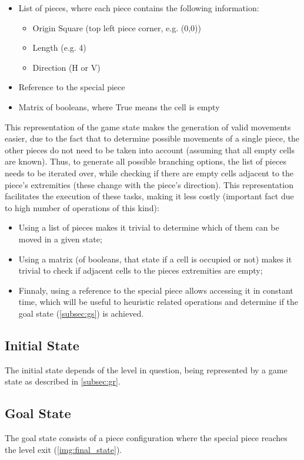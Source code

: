 \documentclass[conference]{IEEEtran}
\begin{document}
\begin{itemize}
    \item List of pieces, where each piece contains the following information:
    \begin{itemize}
        \item Origin Square (top left piece corner, e.g. (0,0))
        \item Length (e.g. 4)
        \item Direction (H or V)
    \end{itemize}
    \item Reference to the special piece
    \item Matrix of booleans, where True means the cell is empty
\end{itemize}

This representation of the game state makes the generation of valid movements easier, due to the fact that to determine possible movements of a single piece, the other pieces do not need to be taken into account (assuming that all empty cells are known). Thus, to generate all possible branching options, the list of pieces needs to be iterated over, while checking if there are empty cells adjacent to the piece's extremities (these change with the piece's direction). This representation facilitates the execution of these tasks, making it less costly (important fact due to high number of operations of this kind):

\begin{itemize}
    \item Using a list of pieces makes it trivial to determine which of them can be moved in a given state;
    \item Using a matrix (of booleans, that state if a cell is occupied or not) makes it trivial to check if adjacent cells to the pieces extremities are empty;
    \item Finnaly, using a reference to the special piece allows accessing it in constant time, which will be useful to heuristic related operations and determine if the goal state (\autoref{subsec:gs}) is achieved.
\end{itemize}

\subsection{Initial State}
The initial state depends of the level in question, being represented by a game state as described in \autoref{subsec:gr}.

\subsection{Goal State} \label{subsec:gs}
The goal state consists of a piece configuration where the special piece reaches the level exit (\autoref{img:final_state}).
\end{document}
